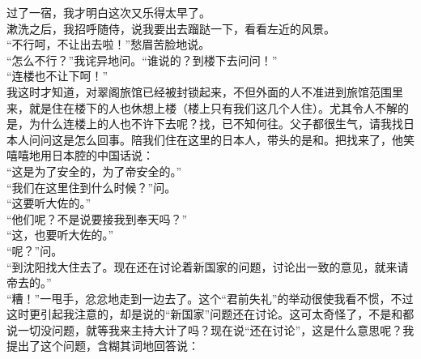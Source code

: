 过了一宿，我才明白这次又乐得太早了。\\

漱洗之后，我招呼随侍，说我要出去蹓跶一下，看看左近的风景。\\

“不行呵，不让出去啦！”愁眉苦脸地说。\\

“怎么不行？”我诧异地问。“谁说的？到楼下去问问！”\\

“连楼也不让下呵！”\\

我这时才知道，对翠阁旅馆已经被封锁起来，不但外面的人不准进到旅馆范围里来，就是住在楼下的人也休想上楼（楼上只有我们这几个人住）。尤其令人不解的是，为什么连楼上的人也不许下去呢？找，已不知何往。父子都很生气，请我找日本人问问这是怎么回事。陪我们住在这里的日本人，带头的是和。把找来了，他笑嘻嘻地用日本腔的中国话说：\\

“这是为了安全的，为了帝安全的。”\\

“我们在这里住到什么时候？”问。\\

“这要听大佐的。”\\

“他们呢？不是说要接我到奉天吗？”\\

“这，也要听大佐的。”\\

“呢？”问。\\

“到沈阳找大住去了。现在还在讨论着新国家的问题，讨论出一致的意见，就来请帝去的。”\\

“糟！”一甩手，忿忿地走到一边去了。这个“君前失礼”的举动很使我看不惯，不过这时更引起我注意的，却是说的“新国家”问题还在讨论。这可太奇怪了，不是和都说一切没问题，就等我来主持大计了吗？现在说“还在讨论”，这是什么意思呢？我提出了这个问题，含糊其词地回答说：\\

